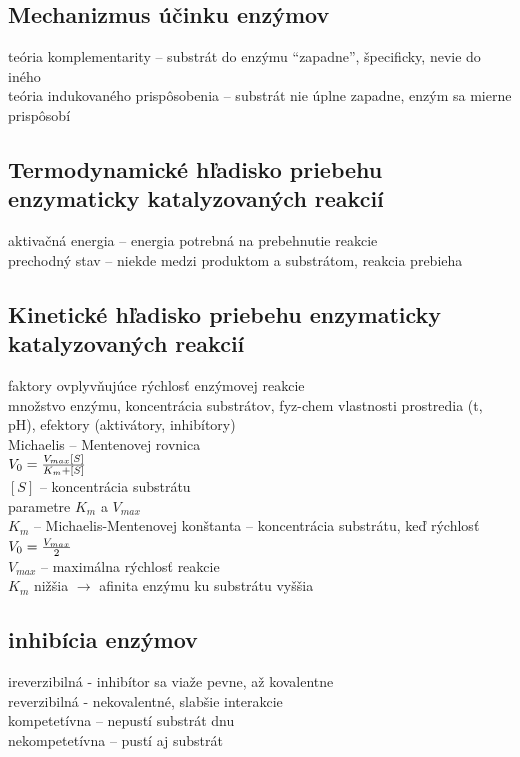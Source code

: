 \subsection{Mechanizmus účinku enzýmov}
teória komplementarity -- substrát do enzýmu “zapadne”, špecificky, nevie do iného\\
teória indukovaného prispôsobenia -- substrát nie úplne zapadne, enzým sa mierne prispôsobí\\
\subsection{Termodynamické hľadisko priebehu enzymaticky katalyzovaných reakcií}
aktivačná energia -- energia potrebná na prebehnutie reakcie\\
prechodný stav -- niekde medzi produktom a substrátom, reakcia prebieha\\
\subsection{Kinetické hľadisko priebehu enzymaticky katalyzovaných reakcií}
faktory ovplyvňujúce rýchlosť enzýmovej reakcie\\
\tab množstvo enzýmu, koncentrácia substrátov, fyz-chem vlastnosti prostredia (t, pH), efektory (aktivátory, inhibítory)\\
Michaelis -- Mentenovej rovnica\\
\tab $V_0 = {{V_{max} [S]} \over {K_m + [S]}}$\\
\tab $[S]$ -- koncentrácia substrátu\\
\tab parametre $K_m$ a $V_{max}$\\
\tab \tab $K_m$ -- Michaelis-Mentenovej konštanta -- koncentrácia substrátu, keď rýchlosť $V_0 = {V_{max}\over 2}$\\
\tab \tab $V_{max}$ -- maximálna rýchlosť reakcie\\
\tab \tab $K_m$ nižšia $\rightarrow$ afinita enzýmu ku substrátu vyššia\\
\subsection{inhibícia enzýmov}
ireverzibilná - inhibítor sa viaže pevne, až kovalentne\\
reverzibilná - nekovalentné, slabšie interakcie\\
\tab kompetetívna -- nepustí substrát dnu\\
\tab nekompetetívna -- pustí aj substrát\\
